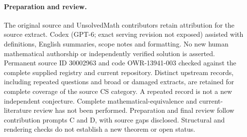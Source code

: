 \documentclass[11pt]{article}
\begin{document}
\paragraph{Preparation and review.}
The original source and UnsolvedMath contributors retain attribution for the source extract. Codex (GPT-6; exact serving revision not exposed) assisted with definitions, English summaries, scope notes and formatting. No new human mathematical authorship or independently verified solution is asserted. Permanent source ID 30002963 and code OWR-13941-003 checked against the complete supplied registry and current repository. Distinct upstream records, including repeated questions and broad or damaged extracts, are retained for complete coverage of the source CS category. A repeated record is not a new independent conjecture. Complete mathematical-equivalence and current-literature review has not been performed. Preparation and final review follow contribution prompts C and D, with source gaps disclosed. Structural and rendering checks do not establish a new theorem or open status.
\label{end:30002963}
\end{document}
